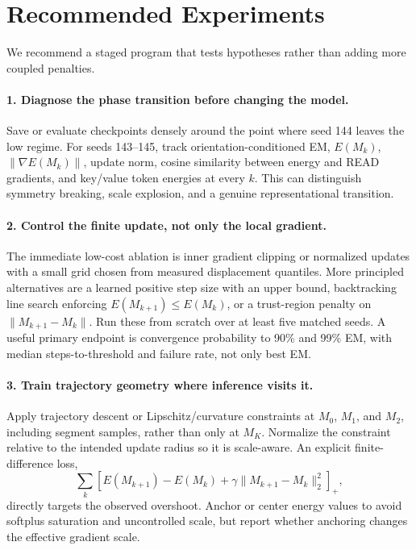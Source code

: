 \documentclass{article}
\begin{document}
\section{Recommended Experiments}
\label{sec:recommendations}

We recommend a staged program that tests hypotheses rather than adding more coupled penalties.

\paragraph{1. Diagnose the phase transition before changing the model.}
Save or evaluate checkpoints densely around the point where seed 144 leaves the low regime.  For seeds 143--145, track orientation-conditioned EM, $E(M_k)$, $\lVert\nabla E(M_k)\rVert$, update norm, cosine similarity between energy and READ gradients, and key/value token energies at every $k$.  This can distinguish symmetry breaking, scale explosion, and a genuine representational transition.

\paragraph{2. Control the finite update, not only the local gradient.}
The immediate low-cost ablation is inner gradient clipping or normalized updates with a small grid chosen from measured displacement quantiles.  More principled alternatives are a learned positive step size with an upper bound, backtracking line search enforcing $E(M_{k+1})\leq E(M_k)$, or a trust-region penalty on $\lVert M_{k+1}-M_k\rVert$.  Run these from scratch over at least five matched seeds.  A useful primary endpoint is convergence probability to 90\% and 99\% EM, with median steps-to-threshold and failure rate, not only best EM.

\paragraph{3. Train trajectory geometry where inference visits it.}
Apply trajectory descent or Lipschitz/curvature constraints at $M_0$, $M_1$, and $M_2$, including segment samples, rather than only at $M_K$.  Normalize the constraint relative to the intended update radius so it is scale-aware.  An explicit finite-difference loss,
\begin{equation}
  \sum_k \left[ E(M_{k+1})-E(M_k)+\gamma\lVert M_{k+1}-M_k\rVert_2^2 \right]_+,
\end{equation}
directly targets the observed overshoot.  Anchor or center energy values to avoid softplus saturation and uncontrolled scale, but report whether anchoring changes the effective gradient scale.
\end{document}
